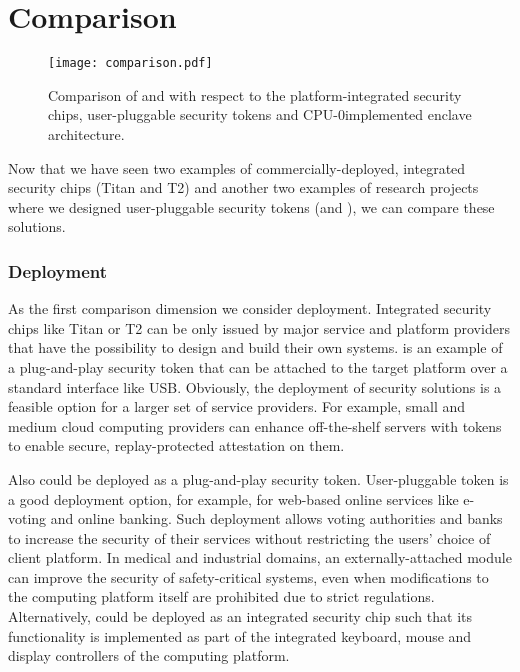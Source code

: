 
\section*{Comparison}

\begin{figure}[t]
	\centering
	\texttt{[image: comparison.pdf]}
	\caption{Comparison of \protection and \proximitee with respect to the platform-integrated security chips, user-pluggable security tokens and CPU-0implemented enclave architecture.}
\label{fig:prototype}   
\end{figure}


Now that we have seen two examples of commercially-deployed, integrated security chips (Titan and T2) and another two examples of research projects where we designed user-pluggable security tokens (\protection and \proximitee), we can compare these solutions. 

\subsubsection*{Deployment}

As the first comparison dimension we consider deployment. Integrated security chips like Titan or T2 can be only issued by major service and platform providers that have the possibility to design and build their own systems. \proximitee is an example of a plug-and-play security token that can be attached to the target platform over a standard interface like USB. Obviously, the deployment of security solutions is a feasible option for a larger set of service providers. For example, small and medium cloud computing providers can enhance off-the-shelf servers with \proximitee tokens to enable secure, replay-protected attestation on them. 

Also \protection could be deployed as a plug-and-play security token. User-pluggable token is a good deployment option, for example, for web-based online services like e-voting and online banking. Such deployment allows voting authorities and banks to increase the security of their services without restricting the users’ choice of client platform. In medical and industrial domains, an externally-attached \protection module can improve the security of safety-critical systems, even when modifications to the computing platform itself are prohibited due to strict regulations. Alternatively, \protection could be deployed as an integrated security chip such that its functionality is implemented as part of the integrated keyboard, mouse and display controllers of the computing platform. 


